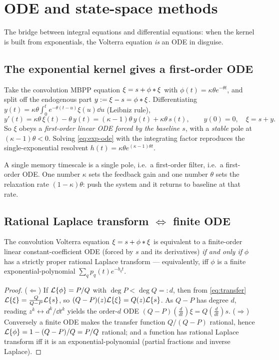 \section{ODE and state-space methods}
\label{app:ode}

The bridge between integral equations and differential equations: when the kernel
is built from exponentials, the Volterra equation \emph{is} an ODE in disguise.

\subsection{The exponential kernel gives a first-order ODE}

Take the convolution MBPP equation $\xi=s+\phi\ast\xi$ with
$\phi(t)=\kappa\theta e^{-\theta t}$, and split off the endogenous part
$y:=\xi-s=\phi\ast\xi$. Differentiating
$y(t)=\kappa\theta\int_0^t e^{-\theta(t-u)}\xi(u)\dd u$ (Leibniz rule),
\begin{equation}
y'(t)=\kappa\theta\,\xi(t)-\theta\,y(t)=(\kappa-1)\theta\,y(t)+\kappa\theta\,s(t),
\qquad y(0)=0,\quad \xi=s+y .
\label{eq:exp-ode}
\end{equation}
So $\xi$ obeys a \emph{first-order linear ODE forced by the baseline $s$}, with a
\emph{stable} pole at $(\kappa-1)\theta<0$. Solving \eqref{eq:exp-ode} with the
integrating factor reproduces the single-exponential resolvent
$h(t)=\kappa\theta e^{(\kappa-1)\theta t}$.

\begin{intuition}
A single memory timescale is a single pole, i.e.\ a first-order filter, i.e.\ a
first-order ODE. One number $\kappa$ sets the feedback gain and one number $\theta$
sets the relaxation rate $(1-\kappa)\theta$: push the system and it returns to
baseline at that rate.
\end{intuition}

\subsection{Rational Laplace transform $\Leftrightarrow$ finite ODE}

\begin{theorem}[Realisation]\label{thm:rational}
The convolution Volterra equation $\xi=s+\phi\ast\xi$ is equivalent to a
finite-order linear constant-coefficient ODE (forced by $s$ and its derivatives)
\emph{if and only if} $\phi$ has a strictly proper rational Laplace transform ---
equivalently, iff $\phi$ is a finite exponential-polynomial
$\sum_q p_q(t)e^{-b_q t}$.
\end{theorem}
\begin{proof}
($\Leftarrow$) If $\mathcal{L}\{\phi\}=P/Q$ with $\deg P<\deg Q=:d$, then from
\eqref{eq:transfer} $\mathcal{L}\{\xi\}=\frac{Q}{Q-P}\mathcal{L}\{s\}$, so
$(Q-P)(z)\mathcal{L}\{\xi\}=Q(z)\mathcal{L}\{s\}$. As $Q-P$ has degree $d$, reading
$z^k\leftrightarrow d^k/\dd t^k$ yields the order-$d$ ODE
$(Q-P)(\tfrac{d}{dt})\xi=Q(\tfrac{d}{dt})s$. ($\Rightarrow$) Conversely a finite ODE
makes the transfer function $Q/(Q-P)$ rational, hence
$\mathcal{L}\{\phi\}=1-(Q-P)/Q=P/Q$ rational; and a function has rational Laplace transform
iff it is an exponential-polynomial (partial fractions and inverse Laplace).
\end{proof}

